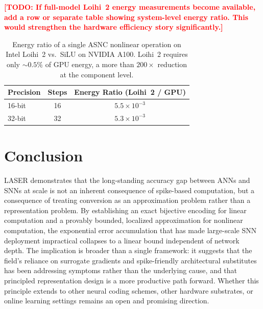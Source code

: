 \documentclass{article}
\theoremstyle{plain}
\theoremstyle{definition}
\theoremstyle{remark}
\begin{document}
\textcolor{red}{\textbf{[TODO: If full-model Loihi~2 energy measurements become
available, add a row or separate table showing system-level energy ratio. This would
strengthen the hardware efficiency story significantly.]}}

\begin{table}[h!]
\centering
\caption{Energy ratio of a single ASNC nonlinear operation on Intel Loihi~2 vs.\
SiLU on NVIDIA A100. Loihi~2 requires only ${\sim}0.5\%$ of GPU energy, a more than
$200\times$ reduction at the component level.}
\label{tab:energy}
\small
\begin{tabular}{lcc}
\toprule
\textbf{Precision} & \textbf{Steps} & \textbf{Energy Ratio (Loihi~2 / GPU)} \\
\midrule
16-bit & 16 & $5.5 \times 10^{-3}$ \\
32-bit & 32 & $5.3 \times 10^{-3}$ \\
\bottomrule
\end{tabular}
\end{table}

\section{Conclusion}
\label{sec:conclusion}
 
LASER demonstrates that the long-standing accuracy gap between ANNs and SNNs at scale
is not an inherent consequence of spike-based computation, but a consequence of
treating conversion as an approximation problem rather than a representation problem.
By establishing an exact bijective encoding for linear computation and a provably
bounded, localized approximation for nonlinear computation, the exponential error
accumulation that has made large-scale SNN deployment impractical collapses to a
linear bound independent of network depth. The implication is broader than a single
framework: it suggests that the field's reliance on surrogate gradients and
spike-friendly architectural substitutes has been addressing symptoms rather than the
underlying cause, and that principled representation design is a more productive path
forward. Whether this principle extends to other neural coding schemes, other hardware
substrates, or online learning settings remains an open and promising direction.




\appendix
\end{document}
